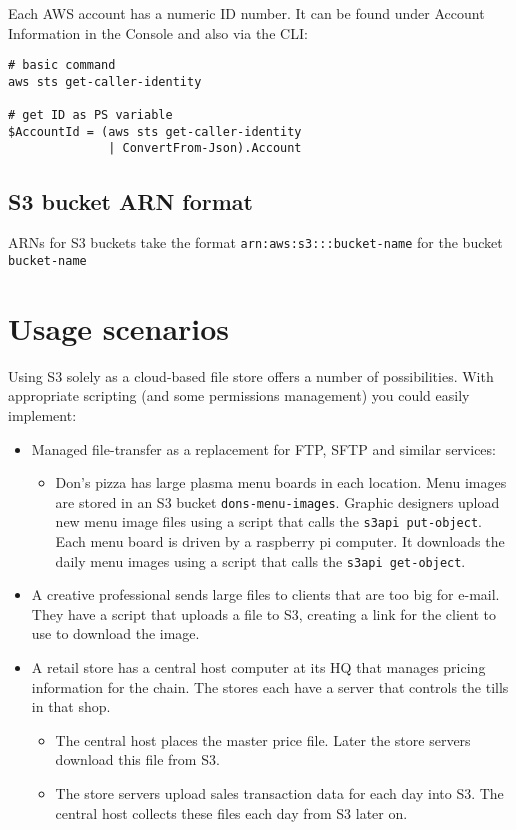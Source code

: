 Each AWS account has a numeric ID number.
It can be found under Account Information in the Console and also via the CLI:

\begin{verbatim}
# basic command
aws sts get-caller-identity

# get ID as PS variable
$AccountId = (aws sts get-caller-identity 
              | ConvertFrom-Json).Account
\end{verbatim}

\subsection{S3 bucket ARN format}
\label{s3-bucket-arn-format}

ARNs for S3 buckets take the format \texttt{arn:aws:s3:::bucket-name}
for the bucket \texttt{bucket-name}

\section{Usage scenarios}
\label{usage-scenarios}

Using S3 solely as a cloud-based file store offers a number of
possibilities. With appropriate scripting (and some permissions
management) you could easily implement:

\begin{itemize}
\item
  Managed file-transfer as a replacement for FTP, SFTP and similar
  services:

  \begin{itemize}
  \item
    Don's pizza has large plasma menu boards in each location. Menu
    images are stored in an S3 bucket \texttt{dons-menu-images}. Graphic
    designers upload new menu image files using a script that calls the
    \texttt{s3api\ put-object}. Each menu board is driven by a raspberry
    pi computer. It downloads the daily menu images using a script that
    calls the \texttt{s3api\ get-object}.
  \end{itemize}
\item
  A creative professional sends large files to clients that are too big
  for e-mail. They have a script that uploads a file to S3, creating a
  link for the client to use to download the image.
\item
  A retail store has a central host computer at its HQ that manages
  pricing information for the chain. The stores each have a server that
  controls the tills in that shop.

  \begin{itemize}
  \item
    The central host places the master price file. Later the store
    servers download this file from S3.
  \item
    The store servers upload sales transaction data for each day into
    S3. The central host collects these files each day from S3 later on.
  \end{itemize}
\end{itemize}

